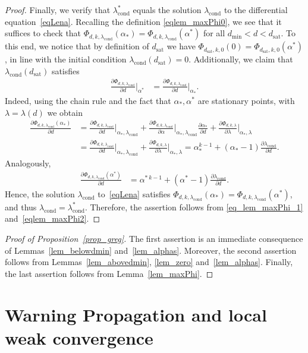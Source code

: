 \documentclass[10pt,reqno]{amsart}
\numberwithin{equation}{section}
\newcommand\dmin{d_{\mathrm{min}}}
\newcommand\dsat{d_{\mathrm{sat}}}
\newcommand{\lcond}{\lambda_{\mathrm{cond}}}
\newcommand\Lem{Lemma}
\newcommand\Prop{Proposition}
\begin{document}
\begin{proof}
	Finally, we verify that $\lcond^*$ equals the solution $\lcond$ to the differential equation~\eqref{eqLena}.
	Recalling the definition \eqref{eqlem_maxPhi0}, we see that it suffices to check that $\Phi_{d,k,\lcond}(\alpha_*)=\Phi_{d,k,\lcond}(\alpha^*)$ for all $\dmin<d<\dsat$.
	To this end, we notice that by definition of $\dsat$ we have $\Phi_{\dsat,k,0}(0)=\Phi_{\dsat,k,0}(\alpha^*)$, in line with the initial condition $\lcond(\dsat)=0$.
	Additionally, we claim that $\lcond(\dsat)$ satisfies
	\begin{align*}
		\frac{\partial\Phi_{d,k,\lcond}}{\partial d}\big|_{\alpha^*}&=\frac{\partial\Phi_{d,k,\lcond}}{\partial d}\big|_{\alpha_*}.
	\end{align*}
	Indeed, using the chain rule and the fact that $\alpha_*,\alpha^*$ are stationary points, with $\lambda=\lambda(d)$ we obtain
	\begin{align*}
		\frac{\partial\Phi_{d,k,\lcond}(\alpha_*)}{\partial d}&=\frac{\partial\Phi_{d,k,\lcond}}{\partial d}\big|_{\alpha_*,\lcond}+\frac{\partial\Phi_{d,k,\lcond}}{\partial \alpha}\big|_{\alpha_*,\lcond}\frac{\partial\alpha_*}{\partial d}+\frac{\partial\Phi_{d,k,\lambda}}{\partial\lambda}\big|_{\alpha_*,\lambda}\\
																	&=\frac{\partial\Phi_{d,k,\lcond}}{\partial d}\big|_{\alpha_*,\lcond}+\frac{\partial\Phi_{d,k,\lambda}}{\partial\lambda}\big|_{\alpha_*,\lambda}
																	=\alpha_*^{k-1}+(\alpha_*-1)\frac{\partial\lcond}{\partial d}.
	\end{align*}
	Analogously,
	\begin{align*}
		\frac{\partial\Phi_{d,k,\lcond}(\alpha^*)}{\partial d}&=\alpha^{*\,k-1}+(\alpha^*-1)\frac{\partial\lcond}{\partial d}.
	\end{align*}
	Hence, the solution $\lcond$ to~\eqref{eqLena} satisfies $\Phi_{d,k,\lcond}(\alpha_*)=\Phi_{d,k,\lcond}(\alpha^*)$, and thus $\lcond=\lcond^*$.
	Therefore, the assertion follows from \eqref{eq_lem_maxPhi_1} and~\eqref{eqlem_maxPhi2}.
\end{proof}

\begin{proof}[Proof of \Prop~\ref{prop_greg}]
	The first assertion is an immediate consequence of \Lem s~\ref{lem_belowdmin} and~\ref{lem_alphas}.
	Moreover, the second assertion follows from \Lem s~\ref{lem_abovedmin}, \ref{lem_zero} and~\ref{lem_alphas}.
	Finally, the last assertion follows from \Lem~\ref{lem_maxPhi}.
\end{proof}


\section{Warning Propagation and local weak convergence}\label{sec_prop_WP}
\end{document}
